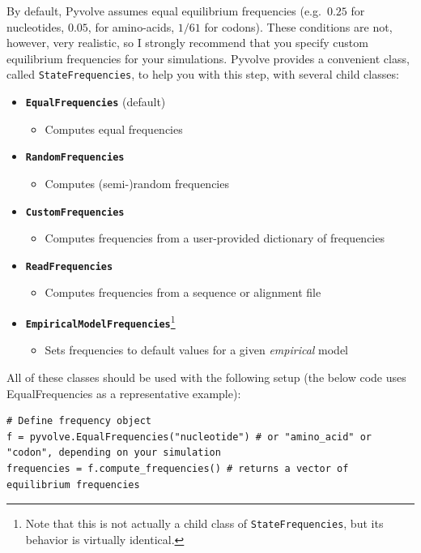 \documentclass{article}
\newcommand{\code}[1]{\texttt{\small{#1}}}
\begin{document}
By default, Pyvolve assumes equal equilibrium frequencies (e.g.\ $0.25$ for nucleotides, $0.05$, for amino-acids, $1/61$ for codons). These conditions are not, however, very realistic, so I strongly recommend that you specify custom equilibrium frequencies for your simulations. Pyvolve provides a convenient class, called \code{StateFrequencies}, to help you with this step, with several child classes:
\begin{itemize}
	\item \code{\textbf{EqualFrequencies}} (default)
	\begin{itemize}
		\item Computes equal frequencies
	\end{itemize}

	\item \code{\textbf{RandomFrequencies}}
	\begin{itemize}
		\item Computes (semi-)random frequencies
	\end{itemize}

	\item \code{\textbf{CustomFrequencies}}
	\begin{itemize}
		\item Computes frequencies from a user-provided dictionary of frequencies
	\end{itemize}

	\item \code{\textbf{ReadFrequencies}}
	\begin{itemize}
		\item Computes frequencies from a sequence or alignment file
	\end{itemize}

	\item \code{\textbf{EmpiricalModelFrequencies}}\footnote{Note that this is not actually a child class of \code{StateFrequencies}, but its behavior is virtually identical.}
	\begin{itemize}
		\item Sets frequencies to default values for a given \emph{empirical} model
	\end{itemize}
\end{itemize}


All of these classes should be used with the following setup (the below code uses EqualFrequencies as a representative example):
\begin{lstlisting}
# Define frequency object
f = pyvolve.EqualFrequencies("nucleotide") # or "amino_acid" or "codon", depending on your simulation
frequencies = f.compute_frequencies() # returns a vector of equilibrium frequencies
\end{lstlisting}
\end{document}
